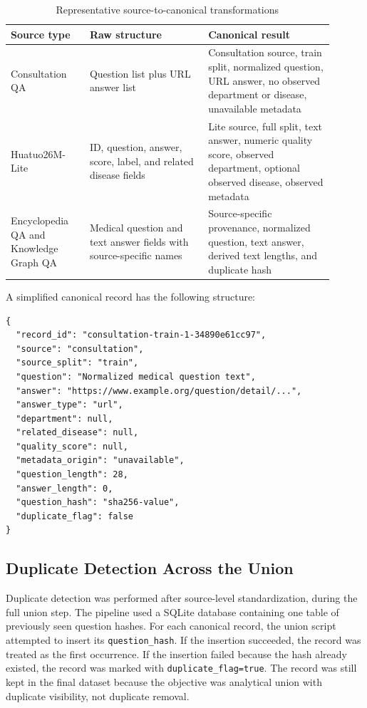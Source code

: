 \documentclass[12pt,a4paper]{article}
\begin{document}
\begin{table}[H]
\centering
\small
\caption{Representative source-to-canonical transformations}
\label{tab:source-transform-examples}
\begin{tabular}{p{0.22\linewidth}p{0.33\linewidth}p{0.35\linewidth}}
\toprule
Source type & Raw structure & Canonical result \\
\midrule
Consultation QA & Question list plus URL answer list & Consultation source, train split, normalized question, URL answer, no observed department or disease, unavailable metadata \\
Huatuo26M-Lite & ID, question, answer, score, label, and related disease fields & Lite source, full split, text answer, numeric quality score, observed department, optional observed disease, observed metadata \\
Encyclopedia QA and Knowledge Graph QA & Medical question and text answer fields with source-specific names & Source-specific provenance, normalized question, text answer, derived text lengths, and duplicate hash \\
\bottomrule
\end{tabular}
\end{table}

A simplified canonical record has the following structure:

\begin{verbatim}
{
  "record_id": "consultation-train-1-34890e61cc97",
  "source": "consultation",
  "source_split": "train",
  "question": "Normalized medical question text",
  "answer": "https://www.example.org/question/detail/...",
  "answer_type": "url",
  "department": null,
  "related_disease": null,
  "quality_score": null,
  "metadata_origin": "unavailable",
  "question_length": 28,
  "answer_length": 0,
  "question_hash": "sha256-value",
  "duplicate_flag": false
}
\end{verbatim}

\subsection{Duplicate Detection Across the Union}

Duplicate detection was performed after source-level standardization, during the full union step. The pipeline used a SQLite database containing one table of previously seen question hashes. For each canonical record, the union script attempted to insert its \texttt{question\_hash}. If the insertion succeeded, the record was treated as the first occurrence. If the insertion failed because the hash already existed, the record was marked with \texttt{duplicate\_flag=true}. The record was still kept in the final dataset because the objective was analytical union with duplicate visibility, not duplicate removal.
\end{document}
